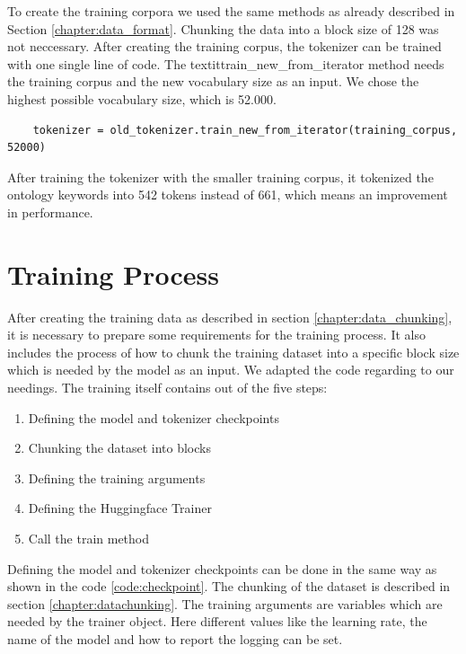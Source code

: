 To create the training corpora we used the same methods as already described in Section \ref{chapter:data_format}. Chunking the data into a block size of 128 was not neccessary. \newline
After creating the training corpus, the tokenizer can be trained with one single line of code. The textit{train\_new\_from\_iterator} method needs the training corpus and the new vocabulary size as an input. We chose the highest possible vocabulary size, which is 52.000.

\begin{code}
	\label{code:train_tokenizer}
\begin{verbatim}
	tokenizer = old_tokenizer.train_new_from_iterator(training_corpus, 52000)
\end{verbatim}
\end{code}
After training the tokenizer with the smaller training corpus, it tokenized the ontology keywords into 542 tokens instead of 661, which means an improvement in performance.

\section{Training Process}
After creating the training data as described in section \ref{chapter:data_chunking}, it is necessary to prepare some requirements for the training process. It also includes the process of how to chunk the training dataset into a specific block size which is needed by the model as an input. We adapted the code regarding to our needings. \newline
The training itself contains out of the five steps:
\begin{enumerate}
	\item Defining the model and tokenizer checkpoints
	\item Chunking the dataset into blocks
	\item Defining the training arguments
	\item Defining the Huggingface Trainer
	\item Call the train method
\end{enumerate}

Defining the model and tokenizer checkpoints can be done in the same way as shown in the code \ref{code:checkpoint}. The chunking of the dataset is described in section \ref{chapter:datachunking}. The training arguments are variables which are needed by the trainer object. Here different values like the learning rate, the name of the model and how to report the logging can be set.

